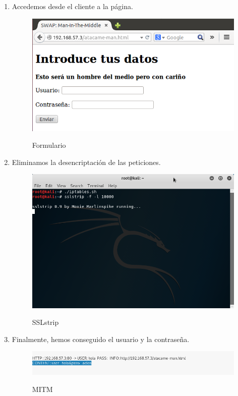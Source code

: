 \documentclass[11pt,a4paper]{article}
\begin{document}
\begin{enumerate}
    \item Accedemos desde el cliente a la página.
    \begin{figure}[H]
        \centering
        \includegraphics[width=1.0\textwidth]{formulario.png}\\[0.1cm]
        \caption{Formulario}
        \label{fig:my_label}
    \end{figure}
    \item Eliminamos la desencriptación de las peticiones.
        \begin{figure}[H]
            \centering
            \includegraphics[width=1.0\textwidth]{sslstrip.png}\\[0.1cm]
            \caption{SSLstrip}
            \label{fig:my_label}
        \end{figure}
    \item Finalmente, hemos conseguido el usuario y la contraseña.
        \begin{figure}[H]
            \centering
            \includegraphics[width=1.0\textwidth]{ataque.png}\\[0.1cm]
            \caption{MITM}
            \label{fig:my_label}
        \end{figure}
\end{enumerate}
\end{document}
